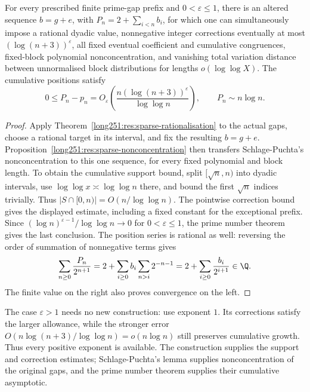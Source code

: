 \begin{samepage}
\begin{corollary}\label{long251:res:jointcountermodel}
For every prescribed finite prime-gap prefix and $0<\varepsilon\le1$,
there is an altered sequence $b=g+e$, with $P_n=2+\sum_{i<n}b_i$,
for which one can simultaneously impose a rational dyadic value, nonnegative
integer corrections eventually at most $(\log(n+3))^\varepsilon$,
all fixed eventual coefficient and cumulative congruences,
fixed-block polynomial nonconcentration, and vanishing total variation distance between unnormalised block distributions for lengths $o(\log\log X)$.  The cumulative positions satisfy
\[
 0\le P_n-p_n=O_\varepsilon\left(
    \frac{n(\log(n+3))^\varepsilon}{\log\log n}\right),
 \qquad P_n\sim n\log n.
\]
\end{corollary}

\end{samepage}
\begin{proof}
Apply Theorem~\ref{long251:res:sparse-rationalisation} to the actual gaps,
choose a rational target in its interval, and fix the resulting $b=g+e$.
Proposition~\ref{long251:res:sparse-nonconcentration} then transfers
Schlage-Puchta's nonconcentration \cite[Lemma~4]{schlagepuchta2011} to this
one sequence, for every fixed polynomial and block length.
To obtain the cumulative support bound, split $[\sqrt n,n)$ into dyadic
intervals, use $\log\log x\asymp\log\log n$ there, and bound the first
$\sqrt n$ indices trivially.  Thus $|S\cap[0,n)|=O(n/\log\log n)$.
The pointwise correction bound gives the displayed estimate, including
a fixed constant for the exceptional prefix.  Since
$(\log n)^{\varepsilon-1}/\log\log n\to0$ for $0<\varepsilon\le1$,
the prime number theorem \cite[Chapter~6]{mv2007} gives the last conclusion.
The position series is rational as well: reversing the order of summation
of nonnegative terms gives
\[
 \sum_{n\ge0}\frac{P_n}{2^{n+1}}
 =2+\sum_{i\ge0}b_i\sum_{n>i}2^{-n-1}
 =2+\sum_{i\ge0}\frac{b_i}{2^{i+1}}\in\Q.
\]
The finite value on the right also proves convergence on the left.
\end{proof}
The case $\varepsilon>1$ needs no new construction: use exponent $1$.
Its corrections satisfy the larger allowance, while the stronger error
$O(n\log(n+3)/\log\log n)=o(n\log n)$ still preserves cumulative growth.
Thus every positive exponent is available.  The construction supplies
the support and correction estimates; Schlage-Puchta's lemma supplies
nonconcentration of the original gaps, and the prime number theorem
supplies their cumulative asymptotic.

